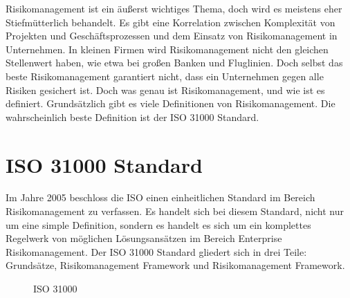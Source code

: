 \documentclass{report}
\begin{document}
\newline
\newline
Risikomanagement ist ein äußerst wichtiges Thema, doch wird es meistens eher  Stiefmütterlich behandelt. Es gibt eine Korrelation zwischen Komplexität von Projekten und Geschäftsprozessen und dem Einsatz von Risikomanagement in Unternehmen. In kleinen Firmen wird Risikomanagement nicht den gleichen Stellenwert haben, wie etwa bei großen Banken und Fluglinien. Doch selbst das beste  Risikomanagement garantiert nicht, dass ein Unternehmen gegen alle Risiken gesichert ist.
\newline
\newline
Doch was genau ist Risikomanagement, und wie ist es definiert. Grundsätzlich gibt es viele Definitionen von Risikomanagement. Die wahrscheinlich beste Definition ist der ISO 31000 Standard.

\section{ISO 31000 Standard}
Im Jahre 2005 beschloss die ISO einen einheitlichen Standard im Bereich Risikomanagement zu verfassen. Es handelt sich bei diesem Standard, nicht nur um eine simple Definition, sondern es handelt es sich um ein komplettes Regelwerk von möglichen Lösungsansätzen im Bereich Enterprise Risikomanagement. Der ISO 31000 Standard gliedert sich in drei Teile: Grundsätze, Risikomanagement Framework und Risikomanagement Framework\cite{Bruehwilder}. 



\begin{figure}[h!]
  \centering
  \caption{ISO 31000}
  \label{fig:bruehilder}
\end{figure}



 
\end{document}
